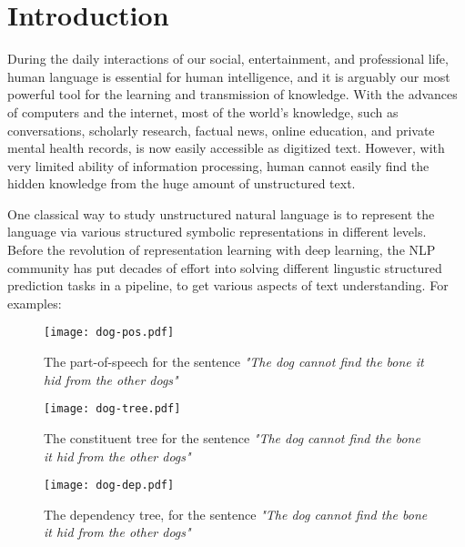 
\chapter{Introduction}
\label{chap:intro}

During the daily interactions of our social, entertainment, and
professional life, human language is essential for human intelligence,
and it is arguably our most powerful tool for the learning and
transmission of knowledge. With the advances of computers and the
internet, most of the world's knowledge, such as conversations,
scholarly research, factual news, online education, and private mental
health records, is now easily accessible as digitized text. However,
with very limited ability of information processing, human cannot
easily find the hidden knowledge from the huge amount of unstructured
text.

One classical way to study unstructured natural language is to
represent the language via various structured symbolic representations
in different levels. Before the revolution of representation learning
with deep learning, the NLP community has put decades of effort into
solving different lingustic structured prediction tasks in a pipeline,
to get various aspects of text understanding. For examples:

\begin{figure}[!th]
\centering
\texttt{[image: dog-pos.pdf]}
\caption{\label{fig:intro-dog-pos}The part-of-speech for the
  sentence \textit{"The dog cannot find the bone it hid from the other
    dogs"}}
\end{figure}

\begin{figure}[!th]
\centering
\texttt{[image: dog-tree.pdf]}
\caption{\label{fig:intro-dog-tree}The constituent tree  for the sentence \textit{"The dog cannot find the bone it
    hid from the other dogs"}}
\end{figure}

\begin{figure}[!th]
\centering
\texttt{[image: dog-dep.pdf]}
\caption{\label{fig:intro-dog-dep}The dependency tree, for the
  sentence \textit{"The dog cannot find the bone it hid from the other
    dogs"}}
\end{figure}

